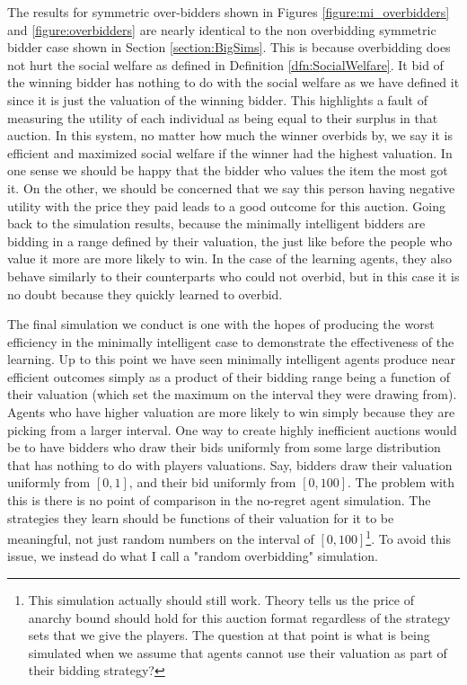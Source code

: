\documentclass[12pt,twoside]{reedthesis}
\begin{document}
The results for symmetric over-bidders shown in Figures \ref{figure:mi_overbidders} and \ref{figure:overbidders} are nearly identical to the non overbidding symmetric bidder case shown in Section \ref{section:BigSims}. This is because overbidding does not hurt the social welfare as defined in Definition \ref{dfn:SocialWelfare}. It bid of the winning bidder has nothing to do with the social welfare as we have defined it since it is just the valuation of the winning bidder. This highlights a fault of measuring the utility of each individual as being equal to their surplus in that auction. In this system, no matter how much the winner overbids by, we say it is efficient and maximized social welfare if the winner had the highest valuation. In one sense we should be happy that the bidder who values the item the most got it. On the other, we should be concerned that we say this person having negative utility with the price they paid leads to a good outcome for this auction. Going back to the simulation results, because the minimally intelligent bidders are bidding in a range defined by their valuation, the just like before the people who value it more are more likely to win. In the case of the learning agents, they also behave similarly to their counterparts who could not overbid, but in this case it is no doubt because they quickly learned to overbid.

The final simulation we conduct is one with the hopes of producing the worst efficiency in the minimally intelligent case to demonstrate the effectiveness of the learning. Up to this point we have seen minimally intelligent agents produce near efficient outcomes simply as a product of their bidding range being a function of their valuation (which set the maximum on the interval they were drawing from). Agents who have higher valuation are more likely to win simply because they are picking from a larger interval. One way to create highly inefficient auctions would be to have bidders who draw their bids uniformly from some large distribution that has nothing to do with players valuations. Say, bidders draw their valuation uniformly from $[0,1]$, and their bid uniformly from $[0,100]$.  The problem with this is there is no point of comparison in the no-regret agent simulation. The strategies they learn should be functions of their valuation for it to be meaningful, not just random numbers on the interval of $[0,100]$\footnote{This simulation actually should still work. Theory tells us the price of anarchy bound should hold for this auction format regardless of the strategy sets that we give the players. The question at that point is what is being simulated when we assume that agents cannot use their valuation as part of their bidding strategy?}. To avoid this issue, we instead do what I call a "random overbidding" simulation. 
\end{document}
